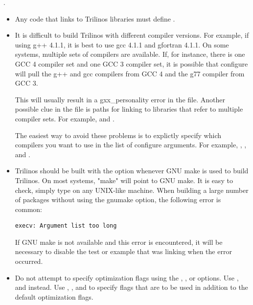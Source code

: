 .

\begin{itemize}

\item Any code that links to Trilinos libraries must define
.

\item It is difficult to build Trilinos with different compiler versions.
For example, if using g++ 4.1.1, it is best to use gcc 4.1.1 and gfortran
4.1.1.  On some systems, multiple sets of compilers are available.  If,
for instance, there is one GCC 4 compiler set and one GCC 3 compiler set,
it is possible that configure will pull the g++ and gcc compilers from
GCC 4 and the g77 compiler from GCC 3.  

This will usually result in a gxx\_personality error in the \newline 
{} file.  Another possible 
clue in the  file is paths for linking to
libraries that refer to multiple compiler sets.  For example, 
 and
\newline {}.

The easiest way to avoid these problems is to explictly specify
which compilers you want to use in the list of configure arguments.  
For example, \newline {},
, and .

\item Trilinos should be built with the 
option whenever GNU make is used to build Trilinos.  On most systems, 
"make" will point to GNU make.  It is easy to check, simply type 
 on any UNIX-like machine.  When building a 
large number of packages without using the gnumake option, the
following error is common: 

\begin{verbatim}
execv: Argument list too long
\end{verbatim}

If GNU make is not available and this error is encountered, it will
be necessary to disable the test or example that was linking when
the error occurred.



\item Do not attempt to specify optimization flags using the
, , or
 options.   Use ,
 and  instead.  Use
, , and
 to specify flags that are to be used in
addition to the default optimization flags.
                                                                                

\end{itemize}
